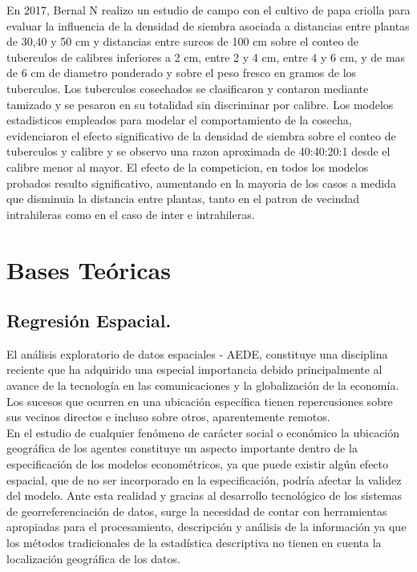 En 2017, Bernal N realizo un estudio de campo con el cultivo de papa criolla para evaluar la influencia de la densidad de siembra asociada a distancias entre plantas de 30,40 y 50 cm y distancias entre surcos de 100 cm sobre el conteo de tuberculos de calibres inferiores a 2 cm, entre 2 y 4 cm, entre 4 y 6 cm, y de mas de 6 cm de diametro ponderado y sobre el peso fresco en gramos de los tuberculos. Los tuberculos cosechados se clasificaron y contaron mediante tamizado y se pesaron en su totalidad sin discriminar por calibre. Los modelos estadisticos empleados para modelar el comportamiento de la cosecha, evidenciaron el efecto significativo de la densidad de siembra sobre el conteo de tuberculos y calibre y se observo una razon aproximada de 40:40:20:1 desde el calibre menor al mayor. El efecto de la competicion, en todos los modelos probados resulto significativo, aumentando en la mayoria de los casos a medida que disminuia la distancia entre plantas, tanto en el patron de vecindad intrahileras como en el caso de inter e intrahileras.

\section{Bases Te\'oricas}

\subsection{Regresión Espacial.}

El análisis exploratorio de datos espaciales - AEDE, constituye una disciplina reciente que ha adquirido una especial importancia debido principalmente al avance de la tecnología en las comunicaciones y la globalización de la economía. Los sucesos que ocurren en una ubicación específica tienen repercusiones sobre sus vecinos directos e incluso sobre otros, aparentemente remotos. \\

En el estudio de cualquier fenómeno de carácter social o económico la ubicación geográfica de los agentes constituye un aspecto importante dentro de la especificación de los modelos econométricos, ya que puede existir algún efecto espacial, que de no ser incorporado en la especificación, podría afectar la validez del modelo. Ante esta realidad y gracias al desarrollo tecnológico de los sistemas de georreferenciación de datos, surge la necesidad de contar con herramientas apropiadas para el procesamiento, descripción y análisis de la información ya que los métodos tradicionales de la estadística descriptiva no tienen en cuenta la localización geográfica de los datos.\\

